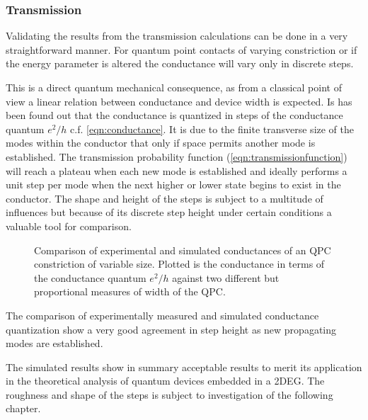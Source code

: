 \subsubsection{Transmission}
Validating the results from the transmission calculations can be done in a very straightforward manner. For quantum point contacts of varying constriction or if the energy parameter is altered the conductance will vary only in discrete steps.\par
This is a direct quantum mechanical consequence, as from a classical point of view a linear relation between conductance and device width is expected.
Is has been found out that the conductance is quantized in steps of the conductance quantum $e^2/h$ c.f. \cref{eqn:conductance}.
It is due to the finite transverse size of the modes within the conductor that only if space permits another mode is established. The transmission probability function (\cref{eqn:transmissionfunction}) will reach a plateau when each new mode is established and ideally performs a unit step per mode when the next higher or lower state begins to exist in the conductor. The shape and height of the steps is subject to a multitude of influences but because of its discrete step height under certain conditions a valuable tool for comparison.\par
\begin{figure}[h]
  \begin{center}
    \caption{Comparison of experimental and simulated conductances of an QPC constriction of variable size. Plotted is the conductance in terms of the conductance quantum $e^2/h$ against two different but proportional measures of width of the QPC.}
\end{center}
\end{figure}
The comparison of experimentally measured and simulated conductance quantization show a very good agreement in step height as new propagating modes are established.\par
The simulated results show in summary acceptable results to merit its application in the theoretical analysis of quantum devices embedded in a 2DEG.
The roughness and shape of the steps is subject to investigation of the following chapter.\par
\FloatBarrier
